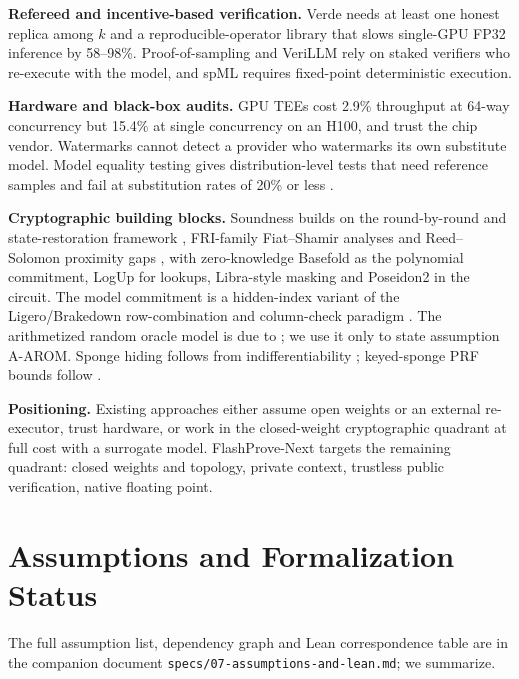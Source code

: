 \documentclass[10pt]{article}
\begin{document}
\textbf{Refereed and incentive-based verification.} Verde \cite{AST+25} needs at least one honest replica among $k$ and a reproducible-operator library that slows single-GPU FP32 inference by 58--98\%. Proof-of-sampling \cite{ZWT+24} and VeriLLM \cite{WZS+25} rely on staked verifiers who re-execute with the model, and spML requires fixed-point deterministic execution.

\textbf{Hardware and black-box audits.} GPU TEEs \cite{CSZS25} cost 2.9\% throughput at 64-way concurrency but 15.4\% at single concurrency on an H100, and trust the chip vendor. Watermarks \cite{KGW+23} cannot detect a provider who watermarks its own substitute model. Model equality testing \cite{GLG25} gives distribution-level tests that need reference samples and fail at substitution rates of 20\% or less \cite{CSZS25}.

\textbf{Cryptographic building blocks.} Soundness builds on the round-by-round and state-restoration framework \cite{BCS16,CCH+19,CMS19}, FRI-family Fiat--Shamir analyses \cite{BGK+23} and Reed--Solomon proximity gaps \cite{BCIKS20}, with zero-knowledge Basefold \cite{ZCF24} as the polynomial commitment, LogUp \cite{Hab22} for lookups, Libra-style masking \cite{XZZ+19} and Poseidon2 \cite{GKS23} in the circuit. The model commitment is a hidden-index variant of the Ligero/Brakedown row-combination and column-check paradigm \cite{AHIV17,GLS+23}. The arithmetized random oracle model is due to \cite{CCGOS23}; we use it only to state assumption A-AROM. Sponge hiding follows from indifferentiability \cite{BDPV08}; keyed-sponge PRF bounds follow \cite{ADMV15,MRV15,DMV17}.

\textbf{Positioning.} Existing approaches either assume open weights or an external re-executor, trust hardware, or work in the closed-weight cryptographic quadrant at full cost with a surrogate model. FlashProve-Next targets the remaining quadrant: closed weights and topology, private context, trustless public verification, native floating point.

\section{Assumptions and Formalization Status}
The full assumption list, dependency graph and Lean correspondence table are in the companion document \texttt{specs/07-assumptions-and-lean.\allowbreak{}md}; we summarize.
\end{document}
